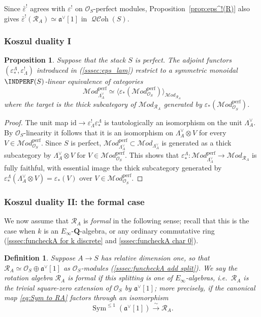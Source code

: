 \documentclass[12pt, oneside]{amsart}
\numberwithin{equation}{section}
\newtheorem{proposition}[subsubsection]{Proposition}
\newtheorem{definition}[subsubsection]{Definition}
\theoremstyle{remark}
\theoremstyle{plain}
\renewcommand{\le}{\leqslant}
\newcommand{\MOD}{\mathcal{M}\textit{od}}
\DeclareMathOperator{\QCOH}{\mathcal{QC}\textit{oh}}
\newcommand{\R}{\mathcal{R}}
\newcommand{\RA}{\R_A}
\newcommand{\frav}{\mathfrak{a}^\vee}
\newcommand{\lamco}{\Lambda^\vee}
\newcommand{\OO}{\mathcal{O}}
\newcommand{\bQ}{\mathbf{Q}}
\newcommand{\id}{\mathrm{id}}
\DeclareMathOperator{\Sym}{Sym}
\newcommand{\eps}{\varepsilon}
\newcommand{\epsb}{\bar{\varepsilon}}
\begin{document}
Since $\epsb^!$ agrees with $\eps^!$ on $\OO_S$-perfect modules, Proposition~\ref{prop:eps^!(R)} also gives $\epsb^!(\RA) \simeq \frav[1]$ in $\QCOH(S)$.

\subsubsection{Koszul duality I}

\begin{proposition}\label{prop:Kosz I}\leavevmode
Suppose that the stack $S$ is perfect.
The adjoint functors $(\eps_*^{\Lambda}, \eps^!_{\Lambda})$ introduced in (\ref{sssec:eps_lam}) restrict to a symmetric monoidal $\INDPERF(S)$-linear equivalence of categories
\[ \MOD_{\lamco_A}^{\mathrm{perf}} \simeq \langle \eps_*(\MOD_{\OO_S}^{\mathrm{perf}}) \rangle_{\MOD_{\RA}} \]
where the target is the thick subcategory of $\MOD_{\RA}$ generated by $\eps_*(\MOD_{\OO_S}^{\mathrm{perf}})$.
\end{proposition}
\begin{proof}
The unit map $\id \to \eps^!_{\Lambda} \eps_*^{\Lambda}$ is tautologically an isomorphism on the unit $\lamco_A$.
By $\OO_S$-linearity it follows that it is an isomorphism on $\lamco_A \otimes V$ for every $V \in \MOD_{\OO_S}^{\mathrm{perf}}$.
Since $S$ is perfect, $\MOD_{\lamco_A}^{\mathrm{perf}} \subset \MOD_{\lamco_A}$ is generated as a thick subcategory by $\lamco_A \otimes V$ for $V \in \MOD_{\OO_S}^{\mathrm{perf}}$.
This shows that $\eps_*^{\Lambda} : \MOD_{\lamco_A}^{\mathrm{perf}} \to \MOD_{\RA}$ is fully faithful, with essential image the thick subcategory generated by $\eps_*^{\Lambda}(\lamco_A \otimes V) = \eps_*(V)$ over $V \in \MOD_{\OO_S}^{\mathrm{perf}}$.
\end{proof}

\subsubsection{Koszul duality II: the formal case}

We now assume that $\RA$ is \emph{formal} in the following sense; recall that this is the case when $k$ is an $E_\infty$-$\bQ$-algebra, or any ordinary commutative ring (\ref{sssec:funcheckA for k discrete} and \ref{sssec:funcheckA char 0}).

\begin{definition}\label{def:formal}
  Suppose $A \to S$ has relative dimension one, so that $\RA \simeq \OO_S \oplus \frav[1]$ as $\OO_S$-modules (\ref{sssec:funcheckA add split}).
  We say the rotation algebra $\RA$ is \emph{formal} if this splitting is one of $E_\infty$-algebras, i.e.\ $\RA$ is the trivial square-zero extension of $\OO_S$ by $\frav[1]$; more precisely, if the canonical map \eqref{eq:Sym to RA} factors through an isomorphism
  \[ \Sym^{\le 1}(\frav[1]) \xrightarrow{\ \sim\ } \RA. \]
\end{definition}
\end{document}
